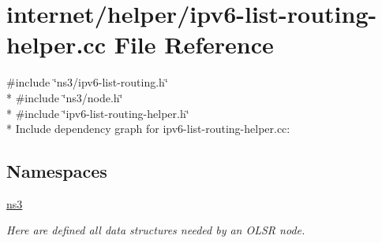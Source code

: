 \hypertarget{ipv6-list-routing-helper_8cc}{}\section{internet/helper/ipv6-\/list-\/routing-\/helper.cc File Reference}
\label{ipv6-list-routing-helper_8cc}
{\ttfamily \#include \char`\"{}ns3/ipv6-\/list-\/routing.\+h\char`\"{}}\\*
{\ttfamily \#include \char`\"{}ns3/node.\+h\char`\"{}}\\*
{\ttfamily \#include \char`\"{}ipv6-\/list-\/routing-\/helper.\+h\char`\"{}}\\*
Include dependency graph for ipv6-\/list-\/routing-\/helper.cc\+:
\subsection*{Namespaces}
\begin{DoxyCompactItemize}
\item 
 \hyperlink{namespacens3}{ns3}
\begin{DoxyCompactList}\small\item\em Here are defined all data structures needed by an O\+L\+SR node. \end{DoxyCompactList}\end{DoxyCompactItemize}

